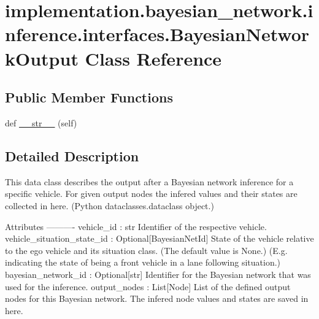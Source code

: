 \hypertarget{classimplementation_1_1bayesian__network_1_1inference_1_1interfaces_1_1_bayesian_network_output}{}\section{implementation.\+bayesian\+\_\+network.\+inference.\+interfaces.\+Bayesian\+Network\+Output Class Reference}
\label{classimplementation_1_1bayesian__network_1_1inference_1_1interfaces_1_1_bayesian_network_output}
\subsection*{Public Member Functions}
\begin{DoxyCompactItemize}
\item 
def \hyperlink{classimplementation_1_1bayesian__network_1_1inference_1_1interfaces_1_1_bayesian_network_output_ac8ca586b35bd86312343d417249b9f8e}{\+\_\+\+\_\+str\+\_\+\+\_\+} (self)
\end{DoxyCompactItemize}


\subsection{Detailed Description}
\begin{DoxyVerb}This data class describes the output after a Bayesian network inference for a specific vehicle. For given output
nodes the infered values and their states are collected in here.
(Python dataclasses.dataclass object.)

Attributes
----------
vehicle_id : str
    Identifier of the respective vehicle.
vehicle_situation_state_id : Optional[BayesianNetId]
    State of the vehicle relative to the ego vehicle and its situation class.  (The default value is None.)
    (E.g. indicating the state of being a front vehicle in a lane following situation.)
bayesian_network_id : Optional[str]
    Identifier for the Bayesian network that was used for the inference.
output_nodes : List[Node]
    List of the defined output nodes for this Bayesian network. The infered node values and states are saved in
    here.
\end{DoxyVerb}
 

